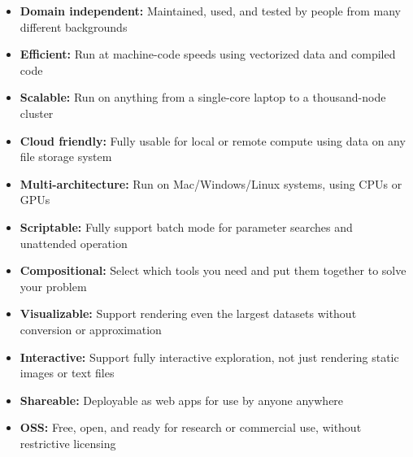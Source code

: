 \begin{itemize}
  \item\textbf{Domain independent:} Maintained, used, and tested by people from many different backgrounds
  \item\textbf{Efficient:} Run at machine-code speeds using vectorized data and compiled code
  \item\textbf{Scalable:} Run on anything from a single-core laptop to a thousand-node cluster
  \item\textbf{Cloud friendly:} Fully usable for local or remote compute using data on any file storage system
  \item\textbf{Multi-architecture:} Run on Mac/Windows/Linux systems, using CPUs or GPUs
  \item\textbf{Scriptable:} Fully support batch mode for parameter searches and unattended operation
  \item\textbf{Compositional:} Select which tools you need and put them together to solve your problem
  \item\textbf{Visualizable:} Support rendering even the largest datasets without conversion or approximation
  \item\textbf{Interactive:} Support fully interactive exploration, not just rendering static images or text files
  \item\textbf{Shareable:} Deployable as web apps for use by anyone anywhere
  \item\textbf{OSS:} Free, open, and ready for research or commercial use, without restrictive licensing
\end{itemize}

